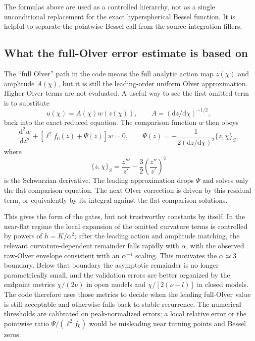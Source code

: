 \documentclass[11pt,a4paper]{article}
\newcommand{\dd}{\mathrm{d}}
\begin{document}
The formulas above are used as a controlled hierarchy, not as a single
unconditional replacement for the exact hyperspherical Bessel function.  It is
helpful to separate the pointwise Bessel call from the source-integration
fillers.

\subsection{What the full-Olver error estimate is based on}

The ``full Olver'' path in the code means the full analytic action map
\(z(\chi)\) and amplitude \(A(\chi)\), but it is still the leading-order
uniform Olver approximation.  Higher Olver terms are not evaluated.  A useful
way to see the first omitted term is to substitute
\[
  u(\chi)=A(\chi)w(z(\chi)),\qquad A=(\dd z/\dd\chi)^{-1/2},
\]
back into the exact reduced equation.  The comparison function \(w\) then obeys
\begin{equation}
  \frac{\dd^2 w}{\dd z^2}
  +\left[\ell^2 f_0(z)+\Psi(z)\right]w=0,
  \qquad
  \Psi(z)=
  -\frac{1}{2(\dd z/\dd\chi)^2}\{z,\chi\}_{S},
  \label{eq:olver-residual}
\end{equation}
where
\begin{equation}
  \{z,\chi\}_{S}
  =\frac{z'''}{z'}-\frac{3}{2}\left(\frac{z''}{z'}\right)^2
\end{equation}
is the Schwarzian derivative.  The leading approximation drops \(\Psi\) and
solves only the flat comparison equation.  The next Olver correction is driven
by this residual term, or equivalently by its integral against the flat
comparison solutions.

This gives the form of the gates, but not trustworthy constants by itself.  In
the near-flat regime the local expansion of the omitted curvature terms is
controlled by powers of \(h=K/\alpha^2\); after the leading action and amplitude
matching, the relevant curvature-dependent remainder falls rapidly with
\(\alpha\), with the observed raw-Olver envelope consistent with an
\(\alpha^{-4}\) scaling.  This motivates the \(\alpha\simeq3\) boundary.  Below
that boundary the asymptotic remainder is no longer parametrically small, and
the validation errors are better organized by the endpoint metrics
\(\chi/(2\nu)\) in open models and \(\chi/[2(\nu-l)]\) in closed models.  The
code therefore uses those metrics to decide when the leading full-Olver value is
still acceptable and otherwise falls back to stable recurrence.  The numerical
thresholds are calibrated on peak-normalized errors; a local relative error or
the pointwise ratio \(\Psi/(\ell^2 f_0)\) would be misleading near turning
points and Bessel zeros.
\end{document}
